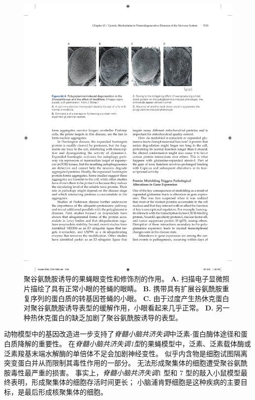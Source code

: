 \begin{figure}[htbp]
	\centering
	\includegraphics[width=1.0\linewidth]{chap63/fig_63_5}
	\caption{聚谷氨酰胺诱导的果蝇眼变性和修饰剂的作用。 
		\textbf{A.} 扫描电子显微照片描绘了具有正常小眼的苍蝇的眼睛。
		\textbf{B.} 携带具有扩展谷氨酰胺重复序列的蛋白质的转基因苍蝇的小眼。
		\textbf{C.} 由于过度产生热休克蛋白对聚谷氨酰胺诱导表型的缓解作用，小眼看起来几乎正常。
		\textbf{D.} 另一种热休克蛋白的缺乏加剧了聚谷氨酰胺诱导的表型。}
	\label{fig:63_5}
\end{figure}


动物模型中的基因改造进一步支持了\textit{脊髓小脑共济失调}中泛素-蛋白酶体途径和蛋白质降解的重要性。
在\textit{脊髓小脑共济失调1型}的果蝇模型中，泛素、泛素载体酶或泛素羧基末端水解酶的单倍体不足会加剧神经变性。
似乎内含物是细胞试图隔离突变蛋白并从而限制其毒性作用的一部分。
无法形成聚集体的细胞遭受聚谷氨酰胺毒性最严重的损害。
事实上，\textit{脊髓小脑共济失调}1 型和 7 型的敲入小鼠模型最终表明，形成聚集体的细胞存活时间更长；
小脑浦肯野细胞是这种疾病的主要目标，是最后形成核聚集体的细胞。



